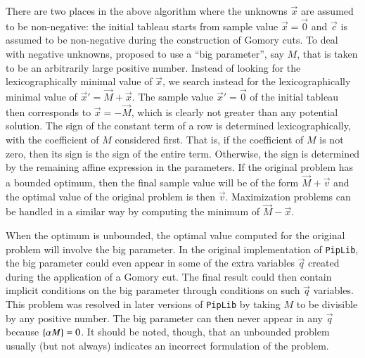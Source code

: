 There are two places in the above algorithm where the unknowns $\vec x$
are assumed to be non-negative: the initial tableau starts from
sample value $\vec x = \vec 0$ and $\vec c$ is assumed to be non-negative
during the construction of Gomory cuts.
To deal with negative unknowns, \textcite[Appendix A.2]{Fea91}
proposed to use a ``big parameter'', say $M$, that is taken to be
an arbitrarily large positive number.  Instead of looking for the
lexicographically minimal value of $\vec x$, we search instead
for the lexicographically minimal value of $\vec x' = \vec M + \vec x$.
The sample value $\vec x' = \vec 0$ of the initial tableau then
corresponds to $\vec x = -\vec M$, which is clearly not greater than
any potential solution.  The sign of the constant term of a row
is determined lexicographically, with the coefficient of $M$ considered
first.  That is, if the coefficient of $M$ is not zero, then its sign
is the sign of the entire term.  Otherwise, the sign is determined
by the remaining affine expression in the parameters.
If the original problem has a bounded optimum, then the final sample
value will be of the form $\vec M + \vec v$ and the optimal value
of the original problem is then $\vec v$.
Maximization problems can be handled in a similar way by computing
the minimum of $\vec M - \vec x$.

When the optimum is unbounded, the optimal value computed for
the original problem will involve the big parameter.
In the original implementation of {\tt PipLib}, the big parameter could
even appear in some of the extra variables $\vec q$ created during
the application of a Gomory cut.  The final result could then contain
implicit conditions on the big parameter through conditions on such
$\vec q$ variables.  This problem was resolved in later versions
of {\tt PipLib} by taking $M$ to be divisible by any positive number.
The big parameter can then never appear in any $\vec q$ because
$\left\{\alpha M \right\} = 0$.  It should be noted, though, that an unbounded
problem usually (but not always)
indicates an incorrect formulation of the problem.

